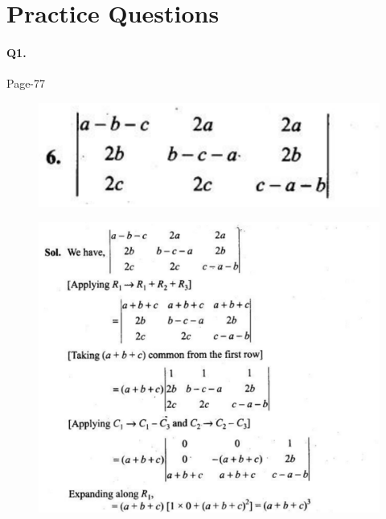 \documentclass{article}
\begin{document}
\section*{Practice Questions}
\paragraph{Q1.}
\begin{flushright}
Page-77
\end{flushright}
\begin{figure}[H]
    \includegraphics[scale=0.5]{determinants_l5_ps_1.png}
\end{figure}
\begin{figure}[H]
    \includegraphics[scale=0.5]{determinants_l5_ps_12.png}
\end{figure}
\end{document}
